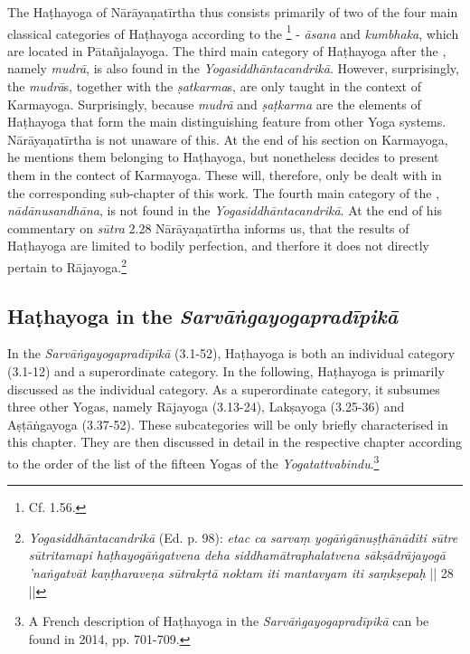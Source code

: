 The Haṭhayoga of Nārāyaṇatīrtha thus consists primarily of two of the four main classical categories of Haṭhayoga according to the \footnote{Cf.  1.56.} - \textit{āsana} and \textit{kumbhaka}, which are located in Pātañjalayoga. The third main category of Haṭhayoga after the , namely \textit{mudrā}, is also found in the \textit{Yogasiddhāntacandrikā}. However, surprisingly, the \textit{mudrā}s, together with the \textit{ṣatkarma}s, are only taught in the context of Karmayoga. Surprisingly, because \textit{mudrā} and \textit{ṣaṭkarma} are the elements of Haṭhayoga that form the main distinguishing feature from other Yoga systems. Nārāyaṇatīrtha is not unaware of this. At the end of his section on Karmayoga, he mentions them belonging to Haṭhayoga, but nonetheless decides to present them in the contect of Karmayoga. These will, therefore, only be dealt with in the corresponding sub-chapter of this work. The fourth main category of the , \textit{nādānusandhāna}, is not found in the \textit{Yogasiddhāntacandrikā}. At the end of his commentary on \textit{sūtra} 2.28 Nārāyaṇatīrtha informs us, that the results of Haṭhayoga are limited to bodily perfection, and therfore it does not directly pertain to Rājayoga.\footnote{\emph{Yogasiddhāntacandrikā} (Ed. p. 98): \textit{etac ca sarvaṃ yogāṅgānuṣṭhānāditi sūtre sūtritamapi haṭhayogāṅgatvena deha siddhamātraphalatvena sākṣādrājayogā 'naṅgatvāt kaṇṭharaveṇa sūtrakṛtā noktam iti mantavyam iti saṃkṣepaḥ} || 28 ||}

\subsection{Haṭhayoga in the \textit{Sarvāṅgayogapradīpikā}}

In the \textit{Sarvāṅgayogapradīpikā} (3.1-52), Haṭhayoga is both an individual category (3.1-12) and a superordinate category. In the following, Haṭhayoga is primarily discussed as the individual category. As a superordinate category, it subsumes three other Yogas, namely Rājayoga (3.13-24), Lakṣayoga (3.25-36) and Aṣṭāṅgayoga (3.37-52). These subcategories will be only briefly characterised in this chapter. They are then discussed in detail in the respective chapter according to the order of the list of the fifteen Yogas of the \textit{Yogatattvabindu}.\footnote{A French description of Haṭhayoga in the \textit{Sarvāṅgayogapradīpikā} can be found in \citeauthor{burger2014sarvangayogapradipika} 2014, pp. 701-709.}


